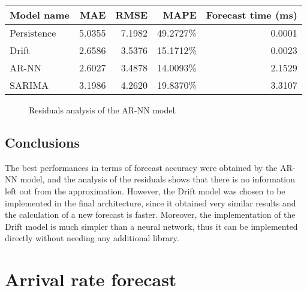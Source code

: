\begin{center}
  \begin{tabular}{ l r r r r }
    \hline
    Model name  & MAE    & RMSE   & MAPE      & Forecast time (ms) \\
    \hline
    Persistence & 5.0355 & 7.1982 & 49.2727\% & 0.0001             \\
    Drift       & 2.6586 & 3.5376 & 15.1712\% & 0.0023             \\
    AR-NN       & 2.6027 & 3.4878 & 14.0093\% & 2.1529             \\
    SARIMA      & 3.1986 & 4.2620 & 19.8370\% & 3.3107             \\
    \hline
  \end{tabular}
\end{center}

\begin{figure}
  \begin{center}
  \end{center}
  \caption{Residuals analysis of the AR-NN model.}
  \label{fig:inflow_rate_forecast_residuals}
\end{figure}

\subsection{Conclusions}
\label{subsec:inflow_rate_forecast_results_conclusions}

The best performances in terms of forecast accuracy were obtained by the AR-NN model, and the analysis of the residuals shows that there is no information left out from the approximation. However, the Drift model was chosen to be implemented in the final architecture, since it obtained very similar results and the calculation of a new forecast is faster. Moreover, the implementation of the Drift model is much simpler than a neural network, thus it can be implemented directly without needing any additional library.

\section{Arrival rate forecast}
\label{sec:arrival_rate_forecast_results}

